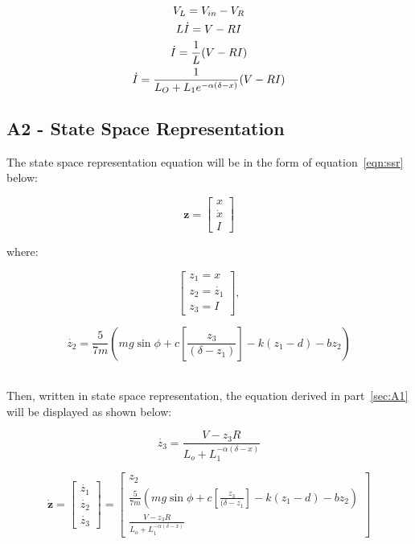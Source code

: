 \documentclass[a4paper,10pt,reqno]{amsart}
\numberwithin{equation}{section}
\begin{document}
\begin{gather}
    V_L=V_{in}-V_R
    \notag\\
    L\dot{I}=V-RI
    \notag\\
    \dot{I}=\frac{1}{L}(V-RI)
    \notag\\
    \dot{I}=\frac{1}{L_O+L_1e^{-\alpha(\delta-x)}}(V-RI)
\end{gather}

\subsection{A2 - State Space Representation}\label{sec:A2}

\par The state space representation equation will be in the form of equation~\ref{eqn:ssr} below:

\begin{equation}
\label{eqn:ssr}
\bm{z}=
\begin{bmatrix}
x
\\
\dot{x}
\\
I
\end{bmatrix}
\end{equation}

\par where:

\begin{equation}
\begin{bmatrix}
z_1=x
\\
z_2=\dot{z_1}
\\
z_3=I
\end{bmatrix},
\end{equation}

\begin{equation}
    \dot{z_2}=\frac{5}{7m}(mg\sin{\phi}+c[\frac{z_3}{(\delta-z_1)}]-k(z_1-d)-bz_2)
\end{equation}
\\
\par Then, written in state space representation, the equation derived in part~\ref{sec:A1} will be displayed as shown below:

\begin{equation}
    \dot{z_3}=\frac{V-z_3R}{L_o+L_1^{-\alpha(\delta-x)}}
\end{equation}



\begin{equation}
\bm{\dot{z}}=
\begin{bmatrix}
\dot{z_1}
\\
\dot{z_2}
\\
\dot{z_3}
\end{bmatrix}
=
\begin{bmatrix}
z_2
\\
\frac{5}{7m}(mg\sin{\phi}+c[\frac{z_3}{(\delta-z_1}]-k(z_1-d)-bz_2)
\\
\frac{V-z_3R}{L_o+L_1^{-\alpha(\delta-x)}}
\end{bmatrix}
\end{equation}
\\
\end{document}

